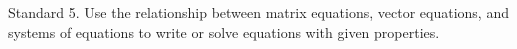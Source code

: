 Standard 5.	Use the relationship between matrix equations, vector equations, and systems of equations to write or solve equations with given properties.

\ifprintanswers
\else %
 \newpage
\fi

\begin{solution}
   
\end{solution}